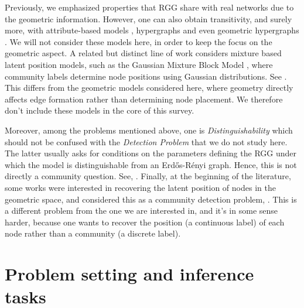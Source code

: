 \documentclass[runningheads]{llncs}
\begin{document}
Previously, we emphasized properties that RGG share with real networks due
to the geometric information. However,
one can also obtain transitivity, and surely more, with attribute-based models
\citep{Li_Sha_Huang_Zhang_2018}, 
hypergraphs \citep{Ruggeri_2023} and even geometric hypergraphs
\citep{Kov_cs_2025}.
We will not consider these models here, in order to keep the focus on the geometric aspect. A related but distinct line of work considers mixture based latent position models, such as the Gaussian Mixture Block Model
\citep{li2024spectralclusteringgaussianmixture}, where community labels determine node positions using Gaussian distributions. See \citep{reynolds2009gaussian} \citep{NIPS1999_97d98119}.
This differs from the geometric models considered here, where geometry directly affects edge formation rather than determining node placement. We therefore don't include these models in the core of this survey.


Moreover, among the problems mentioned above, one is \textit{Distinguishability} which should not be confused with the \textit{Detection Problem} that we do not study here.
The latter usually asks for conditions on the parameters defining the RGG under which the model is distinguishable from 
an Erd\H{o}s-R\'enyi graph. Hence, this is not directly a community question. See,
\citep{bubeck2016testing}
\citep{liu2022testing}
\citep{mao2026randomgeometricgraphssmooth}.
Finally, at the beginning of the literature,
some works were interested in recovering the latent position of nodes in the geometric space,
and considered this as a community detection problem, \citep{valdivia2019latent}
\citep{eldan2022community}.
This is a different problem from the one we are interested in,
and it's in some sense harder, because one wants to recover the position (a continuous label) of each node rather than a community (a discrete label).




\section{Problem setting and inference tasks}\label{sec:setting}
\end{document}
